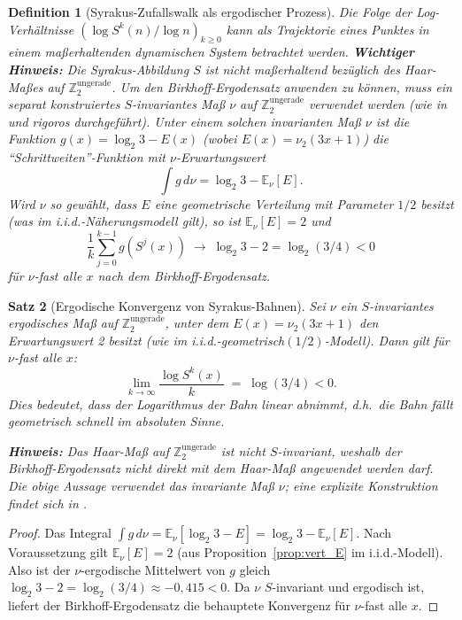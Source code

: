 \documentclass[12pt,a4paper]{article}
\newtheorem{theorem}{Satz}[section]
\newtheorem{definition}[theorem]{Definition}
\begin{document}
\begin{definition}[Syrakus-Zufallswalk als ergodischer Prozess]\label{def:ergodisch_rw}
Die Folge der Log-Verhältnisse $(\log S^k(n) / \log n)_{k \geq 0}$ kann als Trajektorie
eines Punktes in einem maßerhaltenden dynamischen System betrachtet werden.
\textbf{Wichtiger Hinweis:} Die Syrakus-Abbildung $S$ ist \emph{nicht} maßerhaltend
bezüglich des Haar-Maßes auf $\mathbb{Z}_2^{\text{ungerade}}$.
Um den Birkhoff-Ergodensatz anwenden zu können, muss ein separat konstruiertes
$S$-invariantes Maß $\nu$ auf $\mathbb{Z}_2^{\text{ungerade}}$ verwendet werden
(wie in \cite{Tao2022} und \cite{Kontorovich2010} rigoros durchgeführt).
Unter einem solchen invarianten Maß $\nu$ ist die Funktion
$g(x) = \log_2 3 - E(x)$ (wobei $E(x) = \nu_2(3x+1)$) die ``Schrittweiten''-Funktion
mit $\nu$-Erwartungswert
\[
  \int g\, d\nu = \log_2 3 - \mathbb{E}_\nu[E].
\]
Wird $\nu$ so gewählt, dass $E$ eine geometrische Verteilung mit Parameter $1/2$ besitzt
(was im i.i.d.-Näherungsmodell gilt), so ist $\mathbb{E}_\nu[E] = 2$ und
\[
  \frac{1}{k} \sum_{j=0}^{k-1} g(S^j(x)) \;\longrightarrow\; \log_2 3 - 2 = \log_2(3/4) < 0
\]
für $\nu$-fast alle $x$ nach dem Birkhoff-Ergodensatz.
\end{definition}

\begin{theorem}[Ergodische Konvergenz von Syrakus-Bahnen]\label{thm:ergod_konv}
Sei $\nu$ ein $S$-invariantes ergodisches Maß auf $\mathbb{Z}_2^{\text{ungerade}}$, unter
dem $E(x) = \nu_2(3x+1)$ den Erwartungswert 2 besitzt (wie im i.i.d.-geometrisch$(1/2)$-Modell).
Dann gilt für $\nu$-fast alle $x$:
\[
  \lim_{k \to \infty} \frac{\log S^k(x)}{k} \;=\; \log(3/4) < 0.
\]
Dies bedeutet, dass der Logarithmus der Bahn linear abnimmt, d.h.\ die Bahn fällt
\emph{geometrisch schnell} im absoluten Sinne.

\textbf{Hinweis:} Das Haar-Maß auf $\mathbb{Z}_2^{\text{ungerade}}$ ist \emph{nicht}
$S$-invariant, weshalb der Birkhoff-Ergodensatz nicht direkt mit dem Haar-Maß angewendet
werden darf. Die obige Aussage verwendet das invariante Maß $\nu$; eine explizite
Konstruktion findet sich in \cite{Kontorovich2010}.
\end{theorem}

\begin{proof}
Das Integral $\int g\, d\nu = \mathbb{E}_\nu[\log_2 3 - E] = \log_2 3 - \mathbb{E}_\nu[E]$.
Nach Voraussetzung gilt $\mathbb{E}_\nu[E] = 2$
(aus Proposition~\ref{prop:vert_E} im i.i.d.-Modell).
Also ist der $\nu$-ergodische Mittelwert von $g$ gleich $\log_2 3 - 2 = \log_2(3/4) \approx -0{,}415 < 0$.
Da $\nu$ $S$-invariant und ergodisch ist, liefert der Birkhoff-Ergodensatz die behauptete
Konvergenz für $\nu$-fast alle $x$.
\end{proof}
\end{document}
